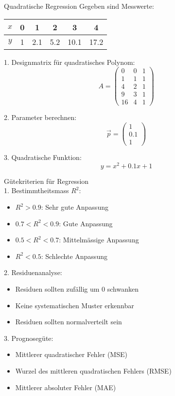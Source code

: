 \begin{example2}{Quadratische Regression}
Gegeben sind Messwerte:
\begin{center}
\begin{tabular}{|c|c|c|c|c|c|}
\hline
$x$ & 0 & 1 & 2 & 3 & 4 \\
\hline
$y$ & 1 & 2.1 & 5.2 & 10.1 & 17.2 \\
\hline
\end{tabular}
\end{center}

1. Designmatrix für quadratisches Polynom:
   $$A = \begin{pmatrix}
   0 & 0 & 1 \\
   1 & 1 & 1 \\
   4 & 2 & 1 \\
   9 & 3 & 1 \\
   16 & 4 & 1
   \end{pmatrix}$$

2. Parameter berechnen:
   $$\vec{p} = \begin{pmatrix} 1 \\ 0.1 \\ 1 \end{pmatrix}$$

3. Quadratische Funktion:
   $$y = x^2 + 0.1x + 1$$
\end{example2}

\begin{concept}{Gütekriterien für Regression}\\
1. Bestimmtheitsmass $R^2$:
   \begin{itemize}
     \item $R^2 > 0.9$: Sehr gute Anpassung
     \item $0.7 < R^2 < 0.9$: Gute Anpassung
     \item $0.5 < R^2 < 0.7$: Mittelmässige Anpassung
     \item $R^2 < 0.5$: Schlechte Anpassung
   \end{itemize}

2. Residuenanalyse:
   \begin{itemize}
     \item Residuen sollten zufällig um 0 schwanken
     \item Keine systematischen Muster erkennbar
     \item Residuen sollten normalverteilt sein
   \end{itemize}

3. Prognosegüte:
   \begin{itemize}
     \item Mittlerer quadratischer Fehler (MSE)
     \item Wurzel des mittleren quadratischen Fehlers (RMSE)
     \item Mittlerer absoluter Fehler (MAE)
   \end{itemize}
\end{concept}

